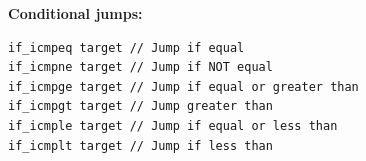 \textbf{Conditional jumps:}
\begin{lstlisting}[language=JVMIS]
if_icmpeq target // Jump if equal
if_icmpne target // Jump if NOT equal
if_icmpge target // Jump if equal or greater than
if_icmpgt target // Jump greater than
if_icmple target // Jump if equal or less than
if_icmplt target // Jump if less than
\end{lstlisting}